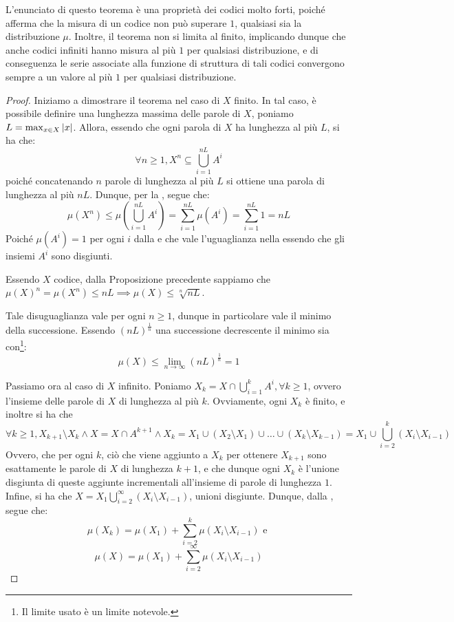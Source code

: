 L'enunciato di questo teorema è una proprietà dei codici molto forti, poiché afferma che la misura di un codice non può superare \(1\), qualsiasi sia la distribuzione \(\mu\).
Inoltre, il teorema non si limita al finito, implicando dunque che anche codici infiniti hanno misura al più \(1\) per qualsiasi distribuzione, e di conseguenza le serie associate alla funzione di struttura di tali codici convergono sempre a un valore al più \(1\) per qualsiasi distribuzione.
\begin{proof}
  Iniziamo a dimostrare il teorema nel caso di \(X\) finito.
  In tal caso, è possibile definire una lunghezza massima delle parole di \(X\), poniamo \(L = \max_{x \in X} \left|x\right|\).
  Allora, essendo che ogni parola di \(X\) ha lunghezza al più \(L\), si ha che:
  \[\forall n \geq 1, X^n \subseteq \bigcup_{i=1}^{nL} A^i\]
  poiché concatenando \(n\) parole di lunghezza al più \(L\) si ottiene una parola di lunghezza al più \(nL\).
  Dunque, per la , segue che:
  \[\mu(X^n) \leq \mu(\bigcup_{i=1}^{nL} A^i) = \sum_{i=1}^{nL} \mu(A^i) = \sum_{i=1}^{nL} 1 = nL\]
  Poiché \(\mu(A^i) = 1\) per ogni \(i\) dalla  e che vale l'uguaglianza nella  essendo che gli insiemi \(A^i\) sono disgiunti.

  Essendo \(X\) codice, dalla Proposizione precedente sappiamo che \({\mu(X)}^n = \mu(X^n) \leq nL \implies \mu(X) \leq \sqrt[n]{nL}\).

  Tale disuguaglianza vale per ogni \(n \geq 1\), dunque in particolare vale il minimo della successione.
  Essendo \({(nL)}^{\frac{1}{n}}\) una successione decrescente il minimo sia con\footnote{Il limite usato è un limite notevole.}:
  \[\mu(X) \leq \lim_{n \to \infty} {(nL)}^{\frac{1}{n}} = 1\]

  Passiamo ora al caso di \(X\) infinito.
  Poniamo \(X_k = X \cap \bigcup_{i=1}^{k} A^i, \forall k \geq 1\), ovvero l'insieme delle parole di \(X\) di lunghezza al più \(k\).
  Ovviamente, ogni \(X_k\) è finito, e inoltre si ha che
  \[\forall k \geq 1, X_{k+1}\setminus X_k \land X = X \cap A^{k+1} \land X_k = X_1 \cup (X_2 \setminus X_1) \cup \ldots \cup (X_k \setminus X_{k-1}) = X_1 \cup \bigcup_{i=2}^{k} (X_i \setminus X_{i-1})\]
  Ovvero, che per ogni \(k\), ciò che viene aggiunto a \(X_k\) per ottenere \(X_{k+1}\) sono esattamente le parole di \(X\) di lunghezza \(k+1\), e che dunque ogni \(X_k\) è l'unione disgiunta di queste aggiunte incrementali all'insieme di parole di lunghezza \(1\).
  Infine, si ha che \(X = X_1 \bigcup_{i=2}^{\infty} (X_i \setminus X_{i-1})\), unioni disgiunte.
  Dunque, dalla , segue che:
  \[\mu(X_k) = \mu(X_1) + \sum_{i=2}^{k} \mu(X_i \setminus X_{i-1}) \text{ e }\]
  \[\mu(X) = \mu(X_1) + \sum_{i=2}^{\infty} \mu(X_i \setminus X_{i-1})\]


\end{proof}
